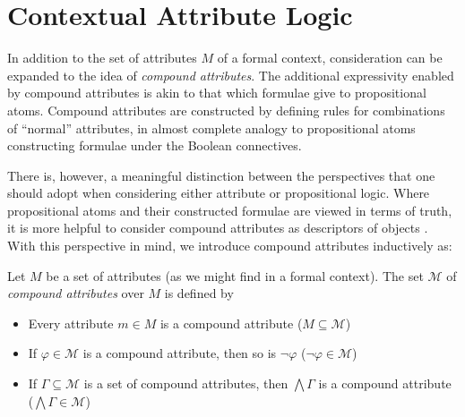 
\section{Contextual Attribute Logic}
\label{section:contextual-attribute-logic}

In addition to the set of attributes $M$ of a formal context, consideration can be expanded to the idea of \textit{compound
attributes}. The additional expressivity enabled by compound attributes is akin to that which formulae give to propositional
atoms. Compound attributes are constructed by defining rules for combinations of ``normal'' attributes, in almost complete
analogy to propositional atoms constructing formulae under the Boolean connectives.

There is, however, a meaningful distinction between the perspectives that one should adopt when considering either attribute
or propositional logic. Where propositional atoms and their constructed formulae are viewed in terms of truth, it is more
helpful to consider compound attributes as descriptors of objects \cite{ganter2024formal,ganter2025language}. With this
perspective in mind, we introduce compound attributes inductively as:

\begin{definition}
	\label{definition:compound-attributes}

	Let $M$ be a set of attributes (as we might find in a formal context). The set $\mathcal{M}$ of \emph{compound
	attributes} over $M$ is defined by
	\begin{itemize}
		\item Every attribute $m \in M$ is a compound attribute \hfill ($M \subseteq \mathcal{M}$)

		\item If $\varphi \in \mathcal{M}$ is a compound attribute, then so is $\neg \varphi$ \hfill ($\neg \varphi \in \mathcal{M}$)

		\item If $\Gamma \subseteq \mathcal{M}$ is a set of compound attributes, then $\bigwedge \Gamma$ is a compound
			attribute \hfill ($\bigwedge \Gamma \in \mathcal{M}$)
	\end{itemize}
\end{definition}

